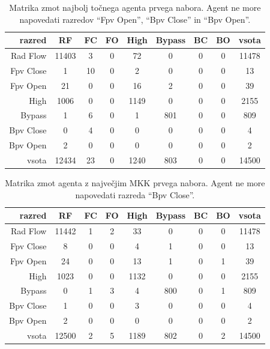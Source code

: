 \begin{table}[H]
    \centering
    \begin{tabular}{||rcccccccc||}
        \hline
        razred    & RF    & FC & FO & High & Bypass & BC & BO & vsota \\ \hline
        Rad Flow  & 11403 & 3  & 0  & 72   & 0      & 0  & 0  & 11478 \\ \hline
        Fpv Close & 1     & 10 & 0  & 2    & 0      & 0  & 0  & 13    \\ \hline
        Fpv Open  & 21    & 0  & 0  & 16   & 2      & 0  & 0  & 39    \\ \hline
        High      & 1006  & 0  & 0  & 1149 & 0      & 0  & 0  & 2155  \\ \hline
        Bypass    & 1     & 6  & 0  & 1    & 801    & 0  & 0  & 809   \\ \hline
        Bpv Close & 0     & 4  & 0  & 0    & 0      & 0  & 0  & 4     \\ \hline
        Bpv Open  & 2     & 0  & 0  & 0    & 0      & 0  & 0  & 2     \\ \hline
        vsota     & 12434 & 23 & 0  & 1240 & 803    & 0  & 0  & 14500 \\ \hline
    \end{tabular}
    \caption{Matrika zmot najbolj točnega agenta prvega nabora. Agent ne more napovedati razredov \enquote{Fpv Open}, \enquote{Bpv Close} in \enquote{Bpv Open}.}
    \label{tab:statlog_acc_1}
\end{table}

\begin{table}[H]
    \centering
    \begin{tabular}{||rcccccccc||}
        \hline
        razred    & RF    & FC & FO & High & Bypass & BC & BO & vsota \\ \hline
        Rad Flow  & 11442 & 1  & 2  & 33   & 0      & 0  & 0  & 11478 \\ \hline
        Fpv Close & 8     & 0  & 0  & 4    & 1      & 0  & 0  & 13    \\ \hline
        Fpv Open  & 24    & 0  & 0  & 13   & 1      & 0  & 1  & 39    \\ \hline
        High      & 1023  & 0  & 0  & 1132 & 0      & 0  & 0  & 2155  \\ \hline
        Bypass    & 0     & 1  & 3  & 4    & 800    & 0  & 1  & 809   \\ \hline
        Bpv Close & 1     & 0  & 0  & 3    & 0      & 0  & 0  & 4     \\ \hline
        Bpv Open  & 2     & 0  & 0  & 0    & 0      & 0  & 0  & 2     \\ \hline
        vsota     & 12500 & 2  & 5  & 1189 & 802    & 0  & 2  & 14500 \\ \hline
    \end{tabular}
    \caption{Matrika zmot agenta z največjim MKK prvega nabora. Agent ne more napovedati razreda \enquote{Bpv Close}.}
    \label{tab:statlog_mcc_1}
\end{table}

